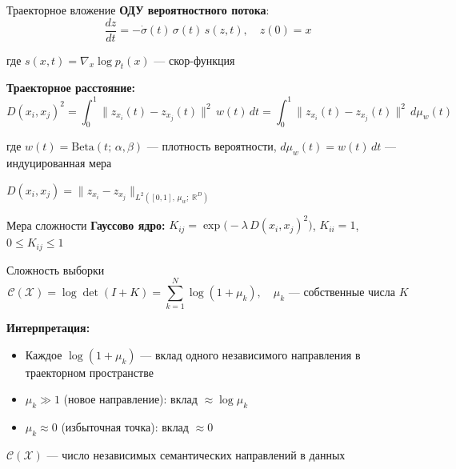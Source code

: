 \documentclass[aspectratio=169]{beamer}
\begin{document}
\begin{frame}{Траекторное вложение}
    \textbf{ОДУ вероятностного потока}:
    \[
        \frac{dz}{dt} = -\dot\sigma(t)\,\sigma(t)\,s(z, t),
        \quad z(0) = x
    \]

    где $s(x,t) = \nabla_x \log p_t(x)$ --- скор-функция 

    \bigskip
    \textbf{Траекторное расстояние:}
    \[
        D(x_i, x_j)^2
        = \int_0^1 \|z_{x_i}(t) - z_{x_j}(t)\|^2\,w(t)\,dt
        = \int_0^1 \|z_{x_i}(t) - z_{x_j}(t)\|^2\,d\mu_w(t)
    \]

    где $w(t) = \mathrm{Beta}(t;\,\alpha,\beta)$ --- плотность вероятности, \;$d\mu_w(t) = w(t)\,dt$ --- индуцированная мера

    \medskip
    $D(x_i, x_j) = \|z_{x_i} - z_{x_j}\|_{L^2([0,1],\,\mu_w;\;\mathbb{R}^D)}$
    
\end{frame}

\begin{frame}{Мера сложности}
    \textbf{Гауссово ядро:}\quad
    $K_{ij} = \exp\!\bigl(-\lambda\,D(x_i, x_j)^2\bigr)$,
    \qquad $K_{ii} = 1$, \quad $0 \leq K_{ij} \leq 1$

    \bigskip
    \begin{block}{Сложность выборки}
        \[
            \mathcal{C}(\mathcal{X}) = \log\det(I + K)
            = \sum_{k=1}^{N} \log(1 + \mu_k),
            \quad \mu_k \text{ --- собственные числа } K
        \]
    \end{block}

    \bigskip
    \textbf{Интерпретация:}
    \begin{itemize}
        \item Каждое $\log(1+\mu_k)$ --- вклад одного независимого направления
              в траекторном пространстве
        \item $\mu_k \gg 1$ (новое направление): вклад $\approx \log\mu_k$
        \item $\mu_k \approx 0$ (избыточная точка): вклад $\approx 0$
    \end{itemize}

    \smallskip
    $\mathcal{C}(\mathcal{X})$ --- число независимых семантических
    направлений в данных
\end{frame}
\end{document}
